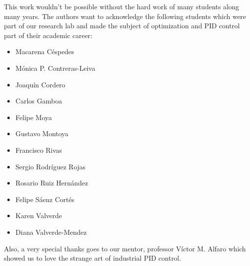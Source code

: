 %
%


This work wouldn't be possible without the hard work of many students along many years. The authors want to acknowledge the following students which were part of our research lab and made the subject of optimization and PID control part of their academic career:
\begin{itemize}
	\item Macarena Céspedes
	\item Mónica P. Contreras-Leiva
	\item Joaquín Cordero
	\item Carlos Gamboa
	\item Felipe Moya
	\item Gustavo Montoya
	\item Francisco Rivas
	\item Sergio Rodríguez Rojas
	\item Rosario Ruiz Hernández
	\item Felipe Sáenz Cortés
	\item Karen Valverde
	\item Diana Valverde-Mendez
\end{itemize}  

Also, a very special thanks goes to our mentor, professor Víctor M. Alfaro which showed us to love the strange art of industrial PID control.